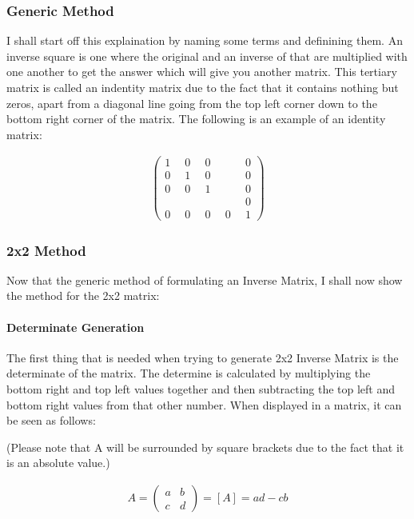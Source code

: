 \documentclass[a4paper,10pt]{article}
\begin{document}
        \subsubsection{Generic Method}
          I shall start off this explaination by naming some terms and definining them. An inverse square is one where the original and an inverse of that are multiplied with one another to get the answer which will give you another matrix. This tertiary matrix is called an indentity matrix due to the fact that it contains nothing but zeros, apart from a diagonal line going from the top left corner down to the bottom right corner of the matrix. The following is an example of an identity matrix:

          \begin{align*}
            \begin{pmatrix}
              1 & 0 & 0 & \quad & 0\\
              0 & 1 & 0 & \quad & 0\\
              0 & 0 & 1 & \quad & 0\\
              \quad & \quad & \quad & \quad & 0\\
              0 & 0 & 0 & 0 & 1
            \end{pmatrix}
          \end{align*}
        \subsubsection{2x2 Method}
          Now that the generic method of formulating an Inverse Matrix, I shall now show the method for the 2x2 matrix:


          \paragraph{Determinate Generation}
            The first thing that is needed when trying to generate 2x2 Inverse Matrix is the determinate of the matrix. The determine is calculated by multiplying the bottom right and top left values together and then subtracting the top left and bottom right values from that other number. When displayed in a matrix, it can be seen as follows:

            (Please note that A will be surrounded by square brackets due to the fact that it is an absolute value.)

            \begin{align*}
              A =
              \begin{pmatrix}
                a & b\\
                c & d
              \end{pmatrix}
              = [A] = ad - cb
            \end{align*}
\end{document}
